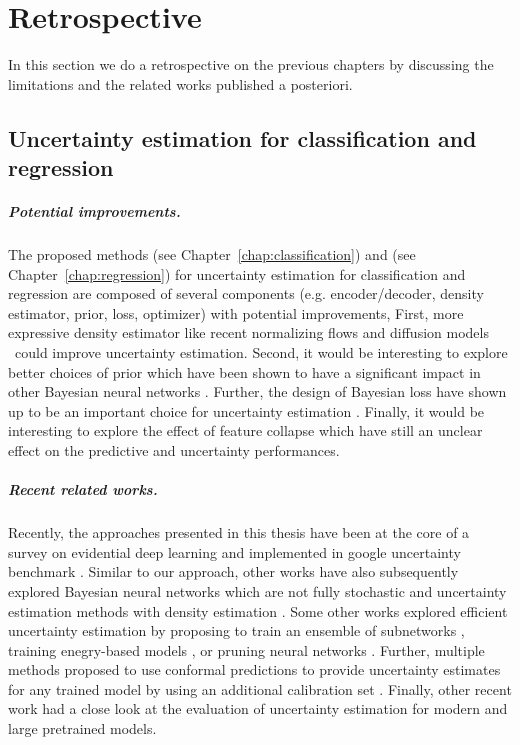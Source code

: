 \chapter{Retrospective}
\label{chap:retrospective}

In this section we do a retrospective on the previous chapters by discussing the limitations and the related works published a posteriori.

\section{Uncertainty estimation for classification and regression} 

\paragraph{Potential improvements.} The proposed methods \PostNetacro{} (see Chapter~\ref{chap:classification}) and \NatPNacro{} (see Chapter~\ref{chap:regression}) for uncertainty estimation for classification and regression are composed of several components (e.g. encoder/decoder, density estimator, prior, loss, optimizer) with potential improvements, First, more expressive density estimator like recent normalizing flows \cite{nf-review} and diffusion models \cite{variationaldiffussion2022kingma} could improve uncertainty estimation. Second, it would be interesting to explore better choices of prior which have been shown to have a significant impact in other Bayesian neural networks \cite{bayesposterior2020wenzel, coldaleatoric2020adlam}. Further, the design of Bayesian loss have shown up to be an important choice for uncertainty estimation \cite{bengs2022pitfalls}. Finally, it would be interesting to explore the effect of feature collapse \cite{due} which have still an unclear effect on the predictive and uncertainty performances.

\paragraph{Recent related works.} Recently, the approaches presented in this thesis have been  at the core of a survey on evidential deep learning \cite{survey_evidential_uncertainty} and implemented in google uncertainty benchmark \cite{nado2021uncertainty}. Similar to our approach, other works have also subsequently explored Bayesian neural networks which are not fully stochastic \cite{bnnfullystochastic2022sharma} and uncertainty estimation methods with density estimation \cite{du2022vos, postels2020hiddenuncertainty, sensoy2020uncertainty}. Some other works explored efficient uncertainty estimation by proposing to train an ensemble of subnetworks \cite{mimo-independent-subnetworks}, training enegry-based models \cite{ood_ebm}, or pruning neural networks \cite{ayle2022robustness-sparse}. Further, multiple methods proposed to use conformal predictions to provide uncertainty estimates for any trained model by using an additional calibration set \cite{conformal-survey, Park2020PAC}. Finally, other recent work \cite{minderer2021revisiting, tran2022plex} had a close look at the evaluation of uncertainty estimation for modern and large pretrained models.

